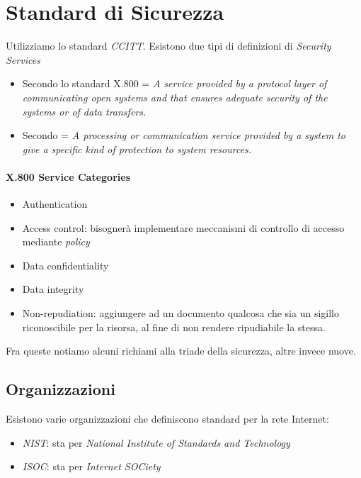 \documentclass[14pt]{extreport}
\begin{document}
\section{Standard di Sicurezza}
Utilizziamo lo standard \textit{CCITT}. Esistono due tipi di definizioni di \textit{Security Services}

\begin{itemize}
    \item Secondo lo standard X.800 = \textit{A service provided by a protocol layer of communicating open systems and that ensures adequate security of the systems or of data transfers.}
    \item Secondo \cite{rfc} = \textit{A processing or communication service provided by a system to give a specific kind of protection to system resources.}
\end{itemize}

\paragraph{X.800 Service Categories}
\begin{itemize}
    \item Authentication
    \item Access control: bisognerà implementare meccanismi di controllo di accesso mediante \textit{policy}
    \item Data confidentiality
    \item Data integrity
    \item Non-repudiation: aggiungere ad un documento qualcosa che sia un sigillo riconoscibile per la risorsa, al fine di non rendere ripudiabile la stessa.
\end{itemize}

Fra queste notiamo alcuni richiami alla triade della sicurezza, altre invece nuove.

\subsection{Organizzazioni}
Esistono varie organizzazioni che definiscono standard per la rete Internet:

\begin{itemize}
    \item \textit{NIST}: sta per \textit{National Institute of Standards and Technology}
    \item \textit{ISOC}: sta per \textit{Internet SOCiety} 
\end{itemize}
\end{document}
